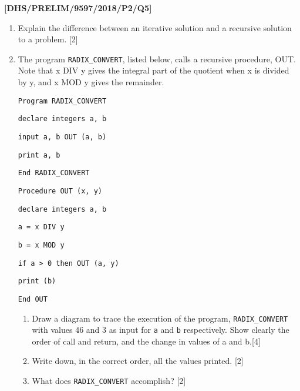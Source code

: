 \item \textbf{{[}DHS/PRELIM/9597/2018/P2/Q5{]} }
\begin{enumerate}
\item Explain the difference between an iterative solution and a recursive
solution to a problem. \hfill{}{[}2{]}
\item The program \texttt{RADIX\_CONVERT}, listed below, calls a recursive
procedure, OUT. Note that x DIV y gives the integral part of the quotient
when x is divided by y, and x MOD y gives the remainder. 

\noindent\begin{minipage}[t]{1\columnwidth}%
\texttt{Program RADIX\_CONVERT }

\texttt{\qquad{}declare integers a, b}

\texttt{\qquad{}input a, b OUT (a, b) }

\texttt{\qquad{}print a, b }

\texttt{End RADIX\_CONVERT }

\bigskip{}

\texttt{Procedure OUT (x, y) }

\texttt{\qquad{}declare integers a, b }

\texttt{\qquad{}a = x DIV y }

\texttt{\qquad{}b = x MOD y }

\texttt{\qquad{}if a > 0 then OUT (a, y) }

\texttt{\qquad{}print (b) }

\texttt{End OUT }%
\end{minipage}
\begin{enumerate}
\item Draw a diagram to trace the execution of the program, \texttt{RADIX\_CONVERT}
with values 46 and 3 as input for \texttt{a} and \texttt{b} respectively.
Show clearly the order of call and return, and the change in values
of a and b.\hfill{}{[}4{]}
\item Write down, in the correct order, all the values printed. \hfill{}{[}2{]}
\item What does \texttt{RADIX\_CONVERT} accomplish? \hfill{}{[}2{]}
\end{enumerate}
\end{enumerate}